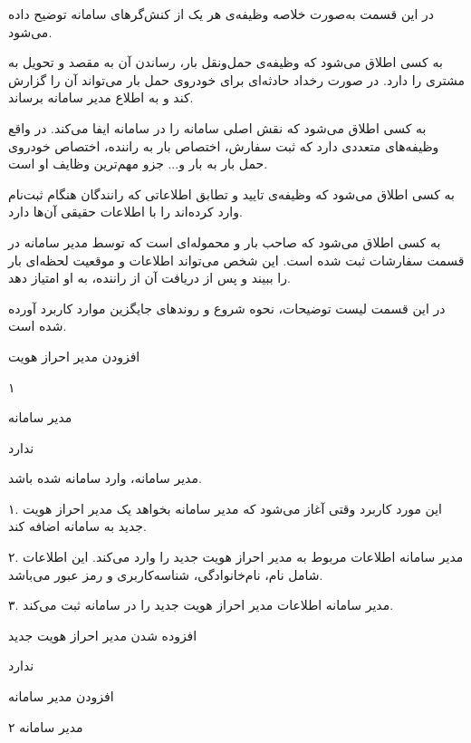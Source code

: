 \newpage
{}
در این قسمت به‌صورت خلاصه وظیفه‌ی هر یک از  کنش‌گرهای سامانه توضیح داده می‌شود.

 به کسی اطلاق می‌شود که وظیفه‌ی حمل‌ونقل بار، رساندن آن به مقصد و تحویل به مشتری را دارد. در صورت رخداد حادثه‌ای برای خودروی حمل بار می‌تواند آن را گزارش کند و به اطلاع مدیر سامانه برساند.

به کسی اطلاق می‌شود که نقش اصلی سامانه را در سامانه ایفا می‌کند. در واقع وظیفه‌های متعددی دارد که ثبت سفارش، اختصاص بار به راننده، اختصاص خودروی حمل بار به بار و... جزو مهم‌ترین وظایف او است.

به کسی اطلاق می‌شود که وظیفه‌ی تایید و تطابق اطلاعاتی که رانندگان هنگام ثبت‌نام وارد کرده‌اند را با اطلاعات حقیقی آن‌ها دارد.

به کسی اطلاق می‌شود که صاحب بار و محموله‌ای است که توسط مدیر سامانه در قسمت سفارشات ثبت شده است. این شخص می‌تواند اطلاعات و موقعیت لحظه‌ای بار را ببیند و پس از دریافت آن از راننده، به او امتیاز دهد.


\newpage
{}

 در این قسمت لیست توضیحات، نحوه شروع و  روندهای جایگزین موارد کاربرد آورده شده است.

افزودن مدیر احراز هویت

۱

مدیر سامانه

ندارد

مدیر سامانه، وارد سامانه شده باشد.


۱. این مورد کاربرد وقتی آغاز می‌شود که مدیر سامانه بخواهد یک مدیر احراز هویت جدید به سامانه اضافه کند.

۲. مدیر سامانه اطلاعات مربوط به مدیر احراز هویت جدید را وارد می‌کند. این اطلاعات شامل نام، نام‌خانوادگی، شناسه‌کاربری و  رمز عبور می‌باشد.

۳. مدیر سامانه اطلاعات مدیر احراز هویت جدید را در سامانه ثبت می‌کند.

افزوده شدن مدیر احراز هویت جدید

ندارد

\noindent \hrulefill

افزودن مدیر سامانه

۲
مدیر سامانه

